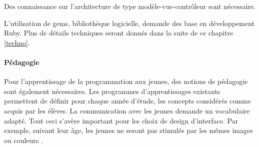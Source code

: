Des connaissance sur l'architecture de type modèle-vue-contrôleur sont nécessaire. 

L'utilisation de gems, bibliothèque logicielle, demande des base en développement Ruby. Plus de détails techniques seront donnés dans la suite de ce chapitre \ref{techno}. %

\paragraph{Pédagogie}
Pour l'apprentissage de la programmation aux jeunes, des notions de pédagogie sont également nécessaires. 
Les programmes d'apprentissages existants permettent de définir pour chaque année d'étude, les concepts considérés comme acquis par les élèves. La communication avec les jeunes demande un vocabulaire adapté. Tout ceci s'avère important pour les choix de design d'interface. Par exemple, suivant leur âge, les jeunes ne seront pas stimulés par les mêmes images ou couleurs \cite{color}. %


